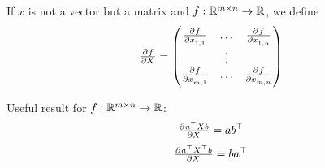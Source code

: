 \begin{definition}
    If $x$ is not a vector but a matrix and $f: \mathbb{R}^{m \times n} \rightarrow \mathbb{R}$, we define
    \begin{equation}
        \pd{f}{X} = \begin{pmatrix}
            \pd{f}{x_{1,1}} & \hdots & \pd{f}{x_{1,n}} \\
            & \vdots \\
            \pd{f}{x_{m,1}} & \hdots & \pd{f}{x_{m,n}}
        \end{pmatrix}
    \end{equation}
\end{definition}

\begin{example}
    Useful result for    $f: \mathbb{R}^{m \times n} \rightarrow \mathbb{R}$:
    \begin{equation}
        \pd{\transpose{a}X b}{X} = a \transpose{b}
    \end{equation} 
    \begin{equation}
        \pd{\transpose{a} \transpose{X} b}{X} = b \transpose{a}
    \end{equation}
\end{example}






